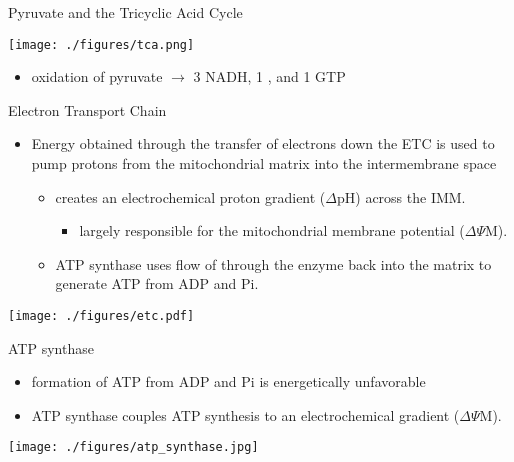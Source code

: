 \documentclass[presentation, smaller]{beamer}
\begin{document}
\begin{frame}[label={sec:org245cf33}]{Pyruvate and the Tricyclic Acid Cycle}
\begin{center}
\texttt{[image: ./figures/tca.png]}
\end{center}

\begin{itemize}
\item oxidation of pyruvate \(\rightarrow\) 3 NADH, 1 , and 1 GTP
\end{itemize}
\end{frame}
\begin{frame}[label={sec:org11c9bd4}]{Electron Transport Chain}
\begin{itemize}
\item Energy obtained through the transfer of electrons down the ETC is used to pump protons from the mitochondrial matrix into the intermembrane space
\begin{itemize}
\item creates an electrochemical proton gradient (\(\Delta\)pH) across the IMM.
\begin{itemize}
\item largely responsible for the mitochondrial membrane potential (\(\Delta \Psi\)M).
\end{itemize}
\item ATP synthase uses flow of  through the enzyme back into the
matrix to generate ATP from ADP and Pi.
\end{itemize}
\end{itemize}


\begin{center}
\texttt{[image: ./figures/etc.pdf]}
\end{center}
\end{frame}

\begin{frame}[label={sec:org3e43b02}]{ATP synthase}
\begin{itemize}
\item formation of ATP from ADP and Pi is energetically unfavorable
\item ATP synthase couples ATP synthesis to an electrochemical gradient (\(\Delta \Psi\)M).
\end{itemize}

\begin{center}
\texttt{[image: ./figures/atp\_synthase.jpg]}
\label{orgf9dfba6}
\end{center}

\centering
{}
\end{frame}
\end{document}
